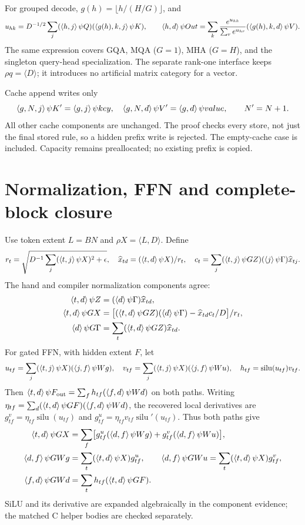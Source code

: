 For grouped decode, $g(h)=\lfloor h/(H/G)\rfloor$, and
\[
 u_{hk}=D^{-1/2}\sum_j(\langle h,j\rangle\,\psi Q)(\langle g(h),k,j\rangle\,\psi K),\qquad
 \langle h,d\rangle\,\psi Out=\sum_k\frac{e^{u_{hk}}}{\sum_r e^{u_{hr}}}(\langle g(h),k,d\rangle\,\psi V).
\]
The same expression covers GQA, MQA ($G=1$), MHA ($G=H$), and the singleton
query-head specialization. The separate rank-one interface keeps $\rho q=\langle D\rangle$;
it introduces no artificial matrix category for a vector.

Cache append writes only
\[
\langle g,N,j\rangle\,\psi K'=\langle g,j\rangle\,\psi key,\quad
\langle g,N,d\rangle\,\psi V'=\langle g,d\rangle\,\psi value,\qquad N'=N+1.
\]
All other cache components are unchanged. The proof checks every store, not just
the final stored rule, so a hidden prefix write is rejected. The empty-cache case
is included. Capacity remains preallocated; no existing prefix is copied.

\newpage\section{Normalization, FFN and complete-block closure}
Use token extent $L=BN$ and $\rho X=\langle L,D\rangle$. Define
\[
 r_t=\sqrt{D^{-1}\sum_j(\langle t,j\rangle\,\psi X)^2+\epsilon},\quad
 \widehat x_{td}=(\langle t,d\rangle\,\psi X)/r_t,\quad
 c_t=\sum_j(\langle t,j\rangle\,\psi GZ)(\langle j\rangle\,\psi \Gamma)\widehat x_{tj}.
\]
The hand and compiler normalization components agree:
\begin{align*}
\langle t,d\rangle\,\psi Z&=(\langle d\rangle\,\psi \Gamma)\widehat x_{td},\\
\langle t,d\rangle\,\psi GX&=\bigl[(\langle t,d\rangle\,\psi GZ)(\langle d\rangle\,\psi \Gamma)-\widehat x_{td}c_t/D\bigr]/r_t,\\
\langle d\rangle\,\psi G\Gamma&=\sum_t(\langle t,d\rangle\,\psi GZ)\widehat x_{td}.
\end{align*}
For gated FFN, with hidden extent $F$, let
\[
 u_{tf}=\sum_j(\langle t,j\rangle\,\psi X)(\langle j,f\rangle\,\psi Wg),\quad
 v_{tf}=\sum_j(\langle t,j\rangle\,\psi X)(\langle j,f\rangle\,\psi Wu),\quad h_{tf}=\operatorname{silu}(u_{tf})v_{tf}.
\]
Then $\langle t,d\rangle\,\psi F_{\rm out}=\sum_f h_{tf}(\langle f,d\rangle\,\psi Wd)$ on both paths.
Writing $\eta_{tf}=\sum_d(\langle t,d\rangle\,\psi GF)(\langle f,d\rangle\,\psi Wd)$, the recovered
local derivatives are $g^v_{tf}=\eta_{tf}\operatorname{silu}(u_{tf})$ and
$g^u_{tf}=\eta_{tf}v_{tf}\operatorname{silu}'(u_{tf})$. Thus both paths give
\begin{align*}
\langle t,d\rangle\,\psi GX&=\sum_f\bigl[g^u_{tf}(\langle d,f\rangle\,\psi Wg)+g^v_{tf}(\langle d,f\rangle\,\psi Wu)\bigr],\\
\langle d,f\rangle\,\psi GWg&=\sum_t(\langle t,d\rangle\,\psi X)g^u_{tf},\qquad
\langle d,f\rangle\,\psi GWu=\sum_t(\langle t,d\rangle\,\psi X)g^v_{tf},\\
\langle f,d\rangle\,\psi GWd&=\sum_t h_{tf}(\langle t,d\rangle\,\psi GF).
\end{align*}
SiLU and its derivative are expanded algebraically in the component evidence;
the matched C helper bodies are checked separately.


